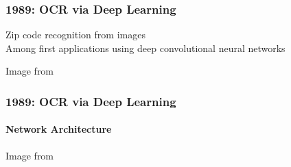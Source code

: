 \documentclass[xetex,professionalfont]{beamer}
\begin{document}

\begin{frame}
\frametitle{1989: OCR via Deep Learning}


Zip code recognition from images\\\medskip %
Among first applications using deep convolutional neural networks %

\bigskip
\begin{center}
	{\centering Image from \cite{lecun1989}}
\end{center}

\end{frame}


\begin{frame}
\frametitle{1989: OCR via Deep Learning}
\framesubtitle{Network Architecture}

\begin{center}
	{\centering Image from \cite{lecun1989}}
\end{center}

\end{frame}
\end{document}
